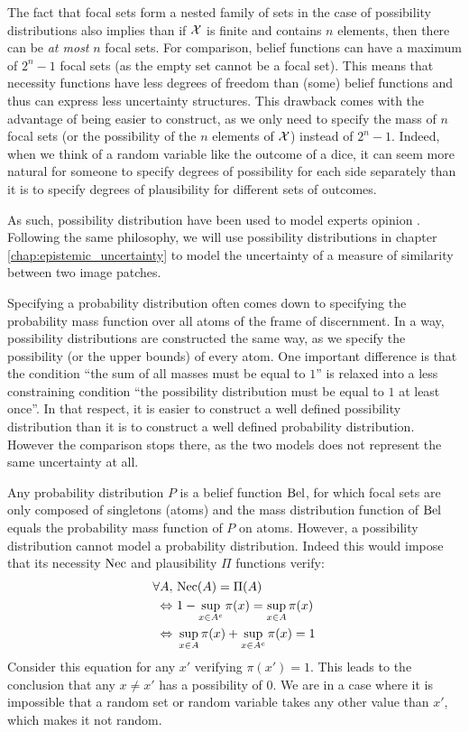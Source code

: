 \begin{remark}
    The fact that focal sets form a nested family of sets in the case of possibility distributions also implies than if ${\mathcal{X}}$ is finite and contains $n$ elements, then there can be \textit{at most} $n$ focal sets. For comparison, belief functions can have a maximum of $2^n-1$ focal sets (as the empty set cannot be a focal set). This means that necessity functions have less degrees of freedom than (some) belief functions and thus can express less uncertainty structures. This drawback comes with the advantage of being easier to construct, as we only need to specify the mass of $n$ focal sets (or the possibility of the $n$ elements of ${\mathcal{X}}$) instead of $2^n-1$. Indeed, when we think of a random variable like the outcome of a dice, it can seem more natural for someone to specify degrees of possibility for each side separately than it is to specify degrees of plausibility for different sets of outcomes. 
    
    As such, possibility distribution have been used to model experts opinion  \cite{baudrit_joint_2007}. Following the same philosophy, we will use possibility distributions in chapter \ref{chap:epistemic_uncertainty} to model the uncertainty of a measure of similarity between two image patches.
\end{remark}

Specifying a probability distribution often comes down to specifying the probability mass function over all atoms of the frame of discernment. In a way, possibility distributions are constructed the same way, as we specify the possibility (or the upper bounds) of every atom. One important difference is that the condition ``the sum of all masses must be equal to $1$'' is relaxed into a less constraining condition ``the possibility distribution must be equal to $1$ at least once''. In that respect, it is easier to construct a well defined possibility distribution than it is to construct a well defined probability distribution. However the comparison stops there, as the two models does not represent the same uncertainty at all.

\begin{remark}
    Any probability distribution $P$ is a belief function ${\mathrm{Bel}}$, for which focal sets are only composed of singletons (atoms) and the mass distribution function of ${\mathrm{Bel}}$ equals the probability mass function of $P$ on atoms. However, a possibility distribution cannot model a probability distribution. Indeed this would impose that its necessity ${\mathrm{Nec}}$ and plausibility $\Pi$ functions verify:
    \begin{align*}
        \forall A, &~{\mathrm{Nec}}(A) = \Pi(A)\\
        \Leftrightarrow&~1-\sup_{x\in A^c}\pi(x) = \sup_{x\in A}\pi(x)\\
        \Leftrightarrow&~ \sup_{x\in A}\pi(x) + \sup_{x\in A^c}\pi(x) = 1
    \end{align*}
    Consider this equation for any $x'$ verifying $\pi(x')=1$. This leads to the conclusion that any $x\neq x'$ has a possibility of $0$. We are in a case where it is impossible that a random set or random variable takes any other value than $x'$, which makes it not random. 
\end{remark}

